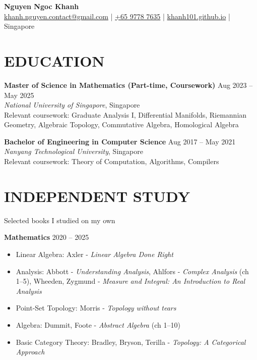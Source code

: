 \documentclass[11pt]{article}
\begin{document}
\begin{center}
    {\LARGE \textbf{Nguyen Ngoc Khanh}} \\
    \href{mailto:khanh.nguyen.contact@gmail.com}{khanh.nguyen.contact@gmail.com} | \href{tel:+6597787635}{+65 9778 7635} | \href{https://khanh101.github.io}{khanh101.github.io} | Singapore
\end{center}

\vspace{0.2cm}

\section*{EDUCATION}

\textbf{Master of Science in Mathematics (Part-time, Coursework)} \hfill Aug 2023 -- May 2025 \\
\textit{National University of Singapore}, Singapore \\
Relevant coursework: Graduate Analysis I, Differential Manifolds, Riemannian Geometry, Algebraic Topology, Commutative Algebra, Homological Algebra

\textbf{Bachelor of Engineering in Computer Science} \hfill Aug 2017 -- May 2021 \\
\textit{Nanyang Technological University}, Singapore \\
Relevant coursework: Theory of Computation, Algorithms, Compilers

\vspace{-0.3cm}
\section*{INDEPENDENT STUDY}

Selected books I studied on my own

\textbf{Mathematics} \hfill 2020 -- 2025 

\begin{itemize}[topsep=0pt, partopsep=0pt, itemsep=0pt, parsep=0pt]
	\item Linear Algebra: Axler - \textit{Linear Algebra Done Right}
	\item Analysis: Abbott - \textit{Understanding Analysis}, Ahlfors - \textit{Complex Analysis} (ch 1--5), Wheeden, Zygmund - \textit{Measure and Integral: An Introduction to Real Analysis}
	\item Point-Set Topology: Morris - \textit{Topology without tears}
	\item Algebra: Dummit, Foote - \textit{Abstract Algebra} (ch 1--10)
	\item Basic Category Theory: Bradley, Bryson, Terilla - \textit{Topology: A Categorical Approach}
\end{itemize}
\end{document}
